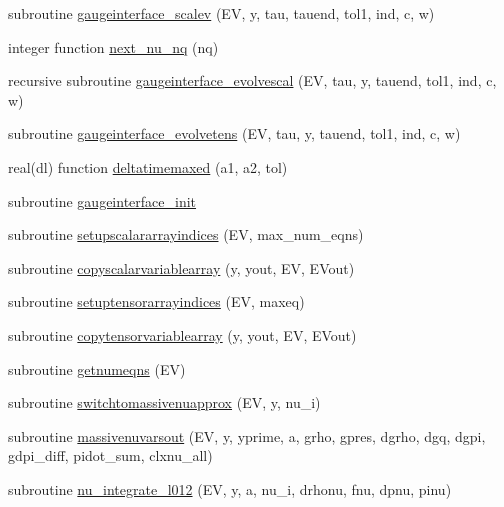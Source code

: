 \begin{DoxyCompactItemize}
\item 
subroutine \mbox{\hyperlink{namespacegaugeinterface_ac02938234bdca8dcd23649b1abb34ab3}{gaugeinterface\+\_\+scalev}} (EV, y, tau, tauend, tol1, ind, c, w)
\item 
integer function \mbox{\hyperlink{namespacegaugeinterface_ae317d979138ff46a65c14f787c0d749c}{next\+\_\+nu\+\_\+nq}} (nq)
\item 
recursive subroutine \mbox{\hyperlink{namespacegaugeinterface_a11f5c8bd6a22537e4a85362dc8dbf3af}{gaugeinterface\+\_\+evolvescal}} (EV, tau, y, tauend, tol1, ind, c, w)
\item 
subroutine \mbox{\hyperlink{namespacegaugeinterface_a048447959e15ae6dd9e887a61e135d0c}{gaugeinterface\+\_\+evolvetens}} (EV, tau, y, tauend, tol1, ind, c, w)
\item 
real(dl) function \mbox{\hyperlink{namespacegaugeinterface_aaf1e4804f8b140406e78f53f199433fa}{deltatimemaxed}} (a1, a2, tol)
\item 
subroutine \mbox{\hyperlink{namespacegaugeinterface_a59182efb978c657918dd88675b2ab0ef}{gaugeinterface\+\_\+init}}
\item 
subroutine \mbox{\hyperlink{namespacegaugeinterface_a50a72debb65475527ccc7e76af616083}{setupscalararrayindices}} (EV, max\+\_\+num\+\_\+eqns)
\item 
subroutine \mbox{\hyperlink{namespacegaugeinterface_a8565dc876beb9e4339c005a72333f31f}{copyscalarvariablearray}} (y, yout, EV, E\+Vout)
\item 
subroutine \mbox{\hyperlink{namespacegaugeinterface_a21f6d1e93445d43fc8247f57dce52716}{setuptensorarrayindices}} (EV, maxeq)
\item 
subroutine \mbox{\hyperlink{namespacegaugeinterface_ab306d2378bd6f559471a11afc145621c}{copytensorvariablearray}} (y, yout, EV, E\+Vout)
\item 
subroutine \mbox{\hyperlink{namespacegaugeinterface_ad273d68dadb4d4fcc10422fed213ca25}{getnumeqns}} (EV)
\item 
subroutine \mbox{\hyperlink{namespacegaugeinterface_ac7f67b6e2bc871b4eb1a6d3453f796a3}{switchtomassivenuapprox}} (EV, y, nu\+\_\+i)
\item 
subroutine \mbox{\hyperlink{namespacegaugeinterface_ac756539212eaeba8021159b26d1d2881}{massivenuvarsout}} (EV, y, yprime, a, grho, gpres, dgrho, dgq, dgpi, gdpi\+\_\+diff, pidot\+\_\+sum, clxnu\+\_\+all)
\item 
subroutine \mbox{\hyperlink{namespacegaugeinterface_aaf5da349a1adc87f4c62f51f1e0c0371}{nu\+\_\+integrate\+\_\+l012}} (EV, y, a, nu\+\_\+i, drhonu, fnu, dpnu, pinu)

\end{DoxyCompactItemize}

